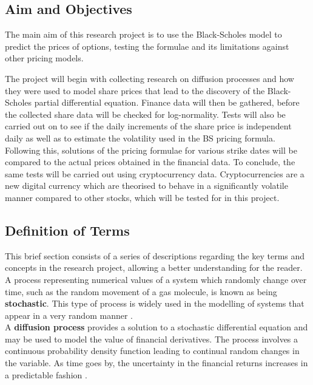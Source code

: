 \documentclass[12pt]{article}
\begin{document}
\subsection{Aim and Objectives}
The main aim of this research project is to use the Black-Scholes model to predict the prices of options, testing the formulae and its limitations against other pricing models. 

The project will begin with collecting research on diffusion processes and how they were used to model share prices that lead to the discovery of the Black-Scholes partial differential equation. Finance data will then be gathered, before the collected share data will be checked for log-normality. Tests will also be carried out on to see if the daily increments of the share price is independent daily as well as to estimate the volatility used in the BS pricing formula. Following this, solutions of the pricing formulae for various strike dates will be compared to the actual prices obtained in the financial data. To conclude, the same tests will be carried out using cryptocurrency data. Cryptocurrencies are a new digital currency which are theorised to behave in a significantly volatile manner compared to other stocks, which will be tested for in this project.

\subsection{Definition of Terms}
This brief section consists of a series of descriptions regarding the key terms and concepts in the research project, allowing a better understanding for the reader.
\\

A process representing numerical values of a system which randomly change over time, such as the random movement of a gas molecule, is known as being \textbf{stochastic}. This type of process is widely used in the modelling of systems that appear in a very random manner \citep{Stochastic2}. 
\\

A \textbf{diffusion process} provides a solution to a stochastic differential equation and may be used to model the value of financial derivatives. The process involves a continuous probability density function leading to continual random changes in the variable. As time goes by, the uncertainty in the financial returns increases in a predictable fashion \citep{Stochastic2}.
\\
\end{document}
